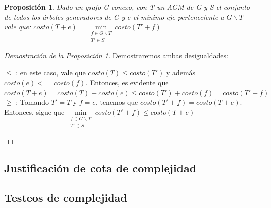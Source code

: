 \documentclass[11pt, a4paper, twoside]{article}
\begin{document}
\newtheorem{prop}{Proposición}
\begin{prop}
Dado un grafo G conexo, con T un AGM de G y S el conjunto de todos los árboles
generadores de G y $e$ el mínimo eje perteneciente a $G \backslash T$ vale que: 
$costo(T+e) = \min\limits_{\substack{f \in G \backslash T \\ T' \in S}} costo(T'+f)$
\end{prop}
\begin{proof}[Demostración de la Proposición 1] 
Demostraremos ambas desigualdades:
\begin{flushleft} $\leq$ : en este caso, vale que $ costo(T) \leq costo(T')$ y además $costo(e) <= costo(f) $. 
Entonces, es evidente que $ costo(T+e) = costo(T)+costo(e) \leq costo(T')+costo(f) = costo(T'+f) $  \\
$\geq$ : Tomando $T'=T$ y $f=e$, tenemos que $costo(T'+f)=costo(T+e)$. 
Entonces, sigue que $ \min\limits_{\substack{f \in G \backslash T \\ T' \in S}} costo(T'+f) \leq costo(T+e) $
\end{flushleft}
\end{proof}

\subsection{Justificación de cota de complejidad}

\begin{algorithm}[H]

\caption{Pseudocódigo para el algoritmo empleado en la resolución}
\end{algorithm}

\subsection{Testeos de complejidad}



\end{document}

